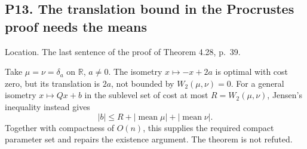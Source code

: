 \documentclass[10pt]{article}
\begin{document}
\subsection*{P13. The translation bound in the Procrustes proof needs the means}
Location. The last sentence of the proof of Theorem 4.28, p. 39.\par
Take \(\mu=\nu=\delta_a\) on \(\mathbb R\), \(a\ne0\). The isometry \(x\mapsto-x+2a\) is optimal with cost zero, but its translation is \(2a\), not bounded by \(W_2(\mu,\nu)=0\). For a general isometry \(x\mapsto Qx+b\) in the sublevel set of cost at most \(R=W_2(\mu,\nu)\), Jensen’s inequality instead gives \[|b|\le R+|\operatorname{mean}\mu|+|\operatorname{mean}\nu|.\] Together with compactness of \(O(n)\), this supplies the required compact parameter set and repairs the existence argument. The theorem is not refuted.\par
\end{document}

